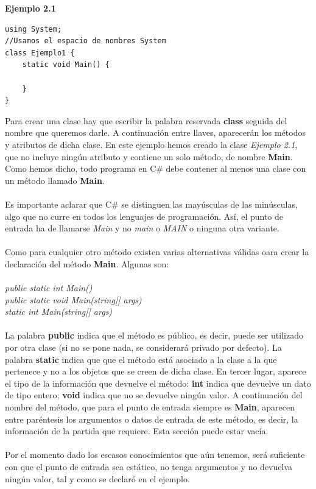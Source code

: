 \documentclass[12pt,a4paper]{report}
\begin{document}
\textbf{Ejemplo 2.1}
\begin{lstlisting}
using System;
//Usamos el espacio de nombres System
class Ejemplo1 {
	static void Main() {
	
	}
}
\end{lstlisting}
Para crear una clase hay que escribir la palabra reservada \textbf{class} seguida del nombre que queremos darle. A continuación entre llaves, aparecerán los métodos y atributos de dicha clase. En este ejemplo hemos creado la clase \textit{Ejemplo 2.1}, que no incluye ningún atributo y contiene un solo método, de nombre \textbf{Main}. Como hemos dicho, todo programa en C\# debe contener al menos una clase con un método llamado \textbf{Main}.\\\\Es importante aclarar que C\# se distinguen las mayúsculas de las minúsculas, algo que no curre en todos los lenguajes de programación. Así, el punto de entrada ha de llamarse \textit{Main} y no \textit{main} o \textit{MAIN} o ninguna otra variante.\\\\Como para cualquier otro método existen varias alternativas válidas oara crear la declaración del método \textbf{Main}. Algunas son: \\\\\textit{public static int Main()\\public static void Main(string[] args)\\static int Main(string[] args)}\\\\La palabra \textbf{public} indica que el método es público, es decir, puede ser utilizado por otra clase (si no se pone nada, se considerará privado por defecto). La palabra \textbf{static} indica que que el método está asociado a la clase a la que pertenece y no a los objetos que se creen de dicha clase. En tercer lugar, aparece el tipo de la información que devuelve el método: \textbf{int} indica que devuelve un dato de tipo entero; \textbf{void}  indica que no se devuelve ningún valor. A continuación del nombre del método, que para el punto de entrada siempre es \textbf{Main}, aparecen entre paréntesis los argumentos o datos de entrada de este método, es decir, la información de la partida que requiere. Esta sección puede estar vacía.\\\\Por el momento dado los escasos conocimientos que aún tenemos, será suficiente con que el punto de entrada sea estático, no tenga argumentos y no devuelva ningún valor, tal y como se declaró en el ejemplo.
\end{document}

